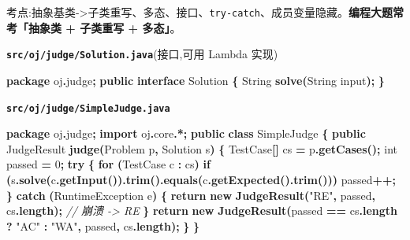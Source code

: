 \documentclass[
  11pt,
]{ctexart}
\newenvironment{Shaded}{\begin{snugshade}}{\end{snugshade}}
\newcommand{\BuiltInTok}[1]{#1}
\newcommand{\CommentTok}[1]{\textcolor[rgb]{0.56,0.35,0.01}{\textit{#1}}}
\newcommand{\ControlFlowTok}[1]{\textcolor[rgb]{0.13,0.29,0.53}{\textbf{#1}}}
\newcommand{\DataTypeTok}[1]{\textcolor[rgb]{0.13,0.29,0.53}{#1}}
\newcommand{\DecValTok}[1]{\textcolor[rgb]{0.00,0.00,0.81}{#1}}
\newcommand{\FunctionTok}[1]{\textcolor[rgb]{0.13,0.29,0.53}{\textbf{#1}}}
\newcommand{\ImportTok}[1]{#1}
\newcommand{\KeywordTok}[1]{\textcolor[rgb]{0.13,0.29,0.53}{\textbf{#1}}}
\newcommand{\NormalTok}[1]{#1}
\newcommand{\OperatorTok}[1]{\textcolor[rgb]{0.81,0.36,0.00}{\textbf{#1}}}
\newcommand{\StringTok}[1]{\textcolor[rgb]{0.31,0.60,0.02}{#1}}
\begin{document}
考点:抽象基类-\textgreater 子类重写、多态、接口、\texttt{try-catch}、成员变量隐藏。\textbf{编程大题常考「抽象类
+ 子类重写 + 多态」}。

\textbf{\texttt{src/oj/judge/Solution.java}}(接口,可用 Lambda 实现)

\begin{Shaded}
\begin{Highlighting}[]
\KeywordTok{package}\ImportTok{ oj}\OperatorTok{.}\ImportTok{judge}\OperatorTok{;}
\KeywordTok{public} \KeywordTok{interface}\NormalTok{ Solution }\OperatorTok{\{} \BuiltInTok{String} \FunctionTok{solve}\OperatorTok{(}\BuiltInTok{String}\NormalTok{ input}\OperatorTok{);} \OperatorTok{\}}
\end{Highlighting}
\end{Shaded}

\textbf{\texttt{src/oj/judge/SimpleJudge.java}}

\begin{Shaded}
\begin{Highlighting}[]
\KeywordTok{package}\ImportTok{ oj}\OperatorTok{.}\ImportTok{judge}\OperatorTok{;}
\KeywordTok{import} \ImportTok{oj}\OperatorTok{.}\ImportTok{core}\OperatorTok{.*;}
\KeywordTok{public} \KeywordTok{class}\NormalTok{ SimpleJudge }\OperatorTok{\{}
    \KeywordTok{public}\NormalTok{ JudgeResult }\FunctionTok{judge}\OperatorTok{(}\NormalTok{Problem p}\OperatorTok{,}\NormalTok{ Solution s}\OperatorTok{)} \OperatorTok{\{}
\NormalTok{        TestCase}\OperatorTok{[]}\NormalTok{ cs }\OperatorTok{=}\NormalTok{ p}\OperatorTok{.}\FunctionTok{getCases}\OperatorTok{();}
        \DataTypeTok{int}\NormalTok{ passed }\OperatorTok{=} \DecValTok{0}\OperatorTok{;}
        \ControlFlowTok{try} \OperatorTok{\{}
            \ControlFlowTok{for} \OperatorTok{(}\NormalTok{TestCase c }\OperatorTok{:}\NormalTok{ cs}\OperatorTok{)}
                \ControlFlowTok{if} \OperatorTok{(}\NormalTok{s}\OperatorTok{.}\FunctionTok{solve}\OperatorTok{(}\NormalTok{c}\OperatorTok{.}\FunctionTok{getInput}\OperatorTok{()).}\FunctionTok{trim}\OperatorTok{().}\FunctionTok{equals}\OperatorTok{(}\NormalTok{c}\OperatorTok{.}\FunctionTok{getExpected}\OperatorTok{().}\FunctionTok{trim}\OperatorTok{()))}\NormalTok{ passed}\OperatorTok{++;}
        \OperatorTok{\}} \ControlFlowTok{catch} \OperatorTok{(}\BuiltInTok{RuntimeException}\NormalTok{ e}\OperatorTok{)} \OperatorTok{\{}
            \ControlFlowTok{return} \KeywordTok{new} \FunctionTok{JudgeResult}\OperatorTok{(}\StringTok{"RE"}\OperatorTok{,}\NormalTok{ passed}\OperatorTok{,}\NormalTok{ cs}\OperatorTok{.}\FunctionTok{length}\OperatorTok{);}   \CommentTok{// 崩溃 {-}\textgreater{} RE}
        \OperatorTok{\}}
        \ControlFlowTok{return} \KeywordTok{new} \FunctionTok{JudgeResult}\OperatorTok{(}\NormalTok{passed }\OperatorTok{==}\NormalTok{ cs}\OperatorTok{.}\FunctionTok{length} \OperatorTok{?} \StringTok{"AC"} \OperatorTok{:} \StringTok{"WA"}\OperatorTok{,}\NormalTok{ passed}\OperatorTok{,}\NormalTok{ cs}\OperatorTok{.}\FunctionTok{length}\OperatorTok{);}
    \OperatorTok{\}}
\OperatorTok{\}}
\end{Highlighting}
\end{Shaded}
\end{document}
